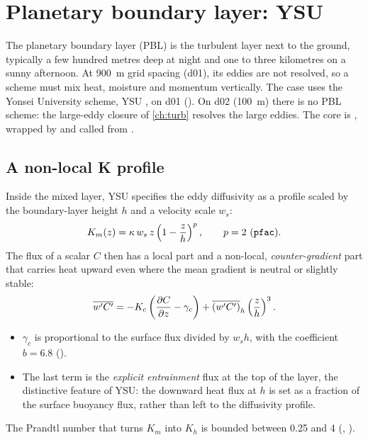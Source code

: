 \chapter{Planetary boundary layer: YSU}\label{ch:pbl}

The planetary boundary layer (PBL) is the turbulent layer next to the ground, typically a few hundred metres deep at
night and one to three kilometres on a sunny afternoon. At 900~m grid spacing (d01), its eddies are not resolved, so
a scheme must mix heat, moisture and momentum vertically. The case uses the Yonsei University scheme, YSU
\citep{hong2006ysu}, on d01 (). On d02 (100~m) there is no PBL scheme: the large-eddy closure
of \cref{ch:turb} resolves the large eddies. The core is , wrapped by
 and called from .

\section{A non-local K profile}

Inside the mixed layer, YSU specifies the eddy diffusivity as a profile scaled by the boundary-layer height $h$ and a
velocity scale $w_s$:
\begin{equation}
  K_m(z) = \kappa\,w_s\,z\left(1 - \frac{z}{h}\right)^{p}, \qquad p = 2 \ (\code{pfac}).
\end{equation}
The flux of a scalar $C$ then has a local part and a non-local, \emph{counter-gradient} part that carries heat
upward even where the mean gradient is neutral or slightly stable:
\begin{equation}
  \overline{w'C'} = -K_c\left(\frac{\partial C}{\partial z} - \gamma_c\right) + \overline{(w'C')}_h\left(\frac{z}{h}\right)^3 .
\end{equation}
\begin{itemize}
  \item $\gamma_c$ is proportional to the surface flux divided by $w_s h$, with the coefficient $b = 6.8$
    ().
  \item The last term is the \emph{explicit entrainment} flux at the top of the layer, the distinctive feature of YSU:
    the downward heat flux at $h$ is set as a fraction of the surface buoyancy flux, rather than left to the
    diffusivity profile.
\end{itemize}
The Prandtl number that turns $K_m$ into $K_h$ is bounded between 0.25 and 4 (, ).

